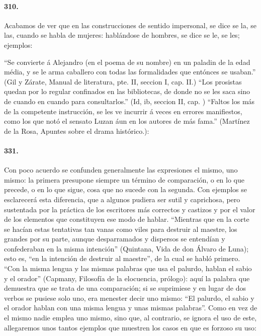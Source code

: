 \documentclass{book}
\begin{document}
\paragraph{310.} Acabamos de ver que en las construcciones de sentido impersonal, se dice se la, se las, cuando se habla de mujeres: hablándose de hombres, se dice se le, se les; ejemplos:

“Se convierte á Alejandro (en el poema de su nombre) en un paladin de la edad média, y se le arma caballero con todas las formalidades que entónces se usaban.” (Gil y Zárate, Manual de literatura, pte. II, seccion I, cap. II.) “Los prosistas quedan por lo regular confinados en las bibliotecas, de donde no se les saca sino de cuando en cuando para consultarlos.” (Id, ib, seccion II, cap. ) “Faltos los más de la competente instrucción, se les ve incurrir á veces en errores manifiestos, como los que notó el sensato Luzan áun en los autores de más fama.” (Martínez de la Rosa, Apuntes sobre el drama histórico.): 

\paragraph{331.} Con poco acuerdo se confunden generalmente las expresiones el mismo, uno mismo: la primera presupone siempre un término de comparación, o en lo que precede, o en lo que sigue, cosa que no sucede con la segunda. Con ejemplos se esclarecerá esta diferencia, que a algunos pudiera ser sutil y caprichosa, pero sustentada por la práctica de los escritores más correctos y castizos y por el valor de los elementos que constituyen ese modo de hablar.
“Mientras que en la corte se hacían estas tentativas tan vanas como viles para destruir al maestre, los grandes por su parte, aunque desparramados y dispersos se entendían y confederaban en la misma intención” (Quintana, Vida de don Álvaro de Luna); esto es, “en la intención de destruir al maestre”, de la cual se habló primero.
“Con la misma lengua y las mismas palabras que usa el palurdo, hablan el sabio y el orador” (Capmany, Filosofía de la elocuencia, prólogo): aquí la palabra que demuestra que se trata de una comparación; si se suprimiese y en lugar de dos verbos se pusiese solo uno, era menester decir uno mismo: “El palurdo, el sabio y el orador hablan con una misma lengua y unas mismas palabras”.
Como en vez de el mismo nadie emplea uno mismo, sino que, al contrario, se ignora el uso de este, allegaremos unos tantos ejemplos que muestren los casos en que es forzoso su uso:
\end{document}
